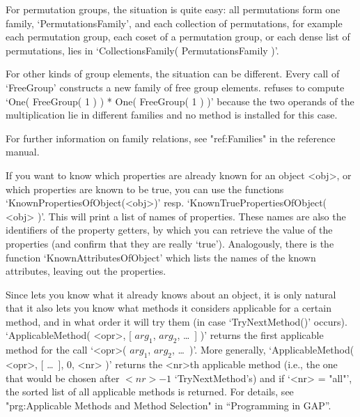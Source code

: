 For permutation groups, the situation is quite easy:
all permutations form  one family, `PermutationsFamily',
and each collection of permutations,
for example each permutation group, each coset of a permutation group,
or each dense list of permutations,
lies in `CollectionsFamily( PermutationsFamily )'.

For other kinds of group elements, the situation can be different.
Every call of `FreeGroup' constructs a new family of free group elements.
{\GAP} refuses to compute `One( FreeGroup( 1 ) ) * One( FreeGroup( 1 ) )'
because the two operands of the multiplication lie in different families
and no method is installed for this case.

For further information on family relations,
see "ref:Families" in the reference manual.

If you want to know  which properties are already known for an object
<obj>, or which properties are known to be true, you can use the
functions `KnownPropertiesOfObject(<obj>)' resp.
`KnownTruePropertiesOfObject( <obj> )'. This will print a list of names
of properties. These names are also the identifiers of the property
getters, by which you can retrieve the value of the properties (and
confirm that they are really `true'). Analogously, there is the function
`KnownAttributesOfObject' which lists the names of the known attributes,
leaving out the properties.

Since {\GAP} lets you know what it already  knows about an object, it is
only natural  that   it also  lets   you know what  methods  it considers
applicable for a certain method, and in  what order it  will try them (in
case `TryNextMethod()'  occurs).   `ApplicableMethod( <opr>, [   $arg_1$,
$arg_2$, \dots\ ]  )' returns the  first  applicable method for the  call
`<opr>( $arg_1$, $arg_2$,  \dots\ )'. More  generally, `ApplicableMethod(
<opr>, [ \dots\ ], 0, <nr> )' returns the <nr>th applicable method (i.e.,
the one  that would be  chosen  after  $<nr>-1$ `TryNextMethod's) and  if
`<nr>  = "all"', the sorted list  of  all applicable methods is returned.
For  details,  see "prg:Applicable Methods  and  Method Selection" in
``Programming in GAP''.


